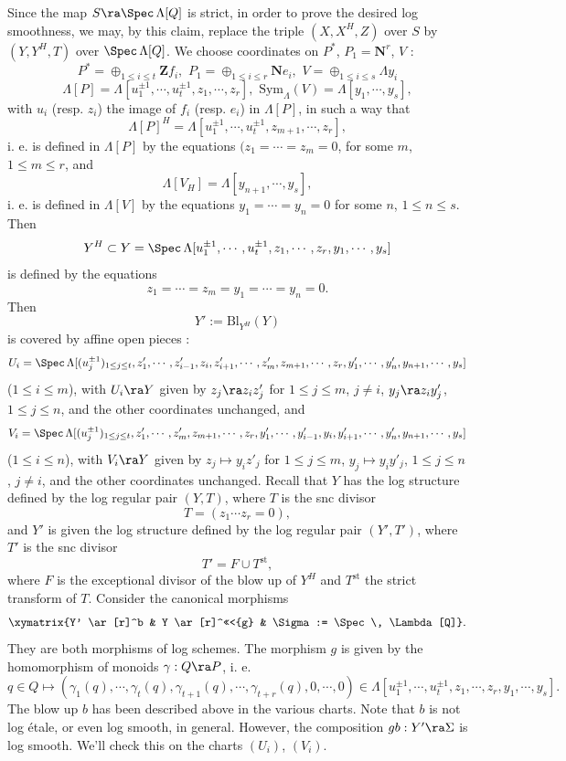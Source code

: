 \documentclass[10pt]{../fichiers-configuration-latex/smfart}
\begin{document}
Since the map $S \ra \Spec \, \Lambda[Q]$ is strict, in order to prove the
desired log smoothness, we may, by this claim, replace the triple $(X, X^H,
Z)$ over $S$ by $(Y,Y^H,T)$ over $\Spec \, \Lambda[Q]$. We choose coordinates on
$P^*$, $P_1 = \mathbf{N}^r$, $V$ : $$ P^* = \oplus_{1 \le i \le t}\mathbf{Z}f_i
, \, \, P_1 = \oplus_{1 \le i \le r}\mathbf{N}e_i, \, \, V = \oplus_{1 \le i
\le s} \Lambda y_i $$ $$ \Lambda[P] = \Lambda[u_1^{\pm 1}, \cdots, u_t^{\pm 1},
z_1, \cdots, z_r], \, \, \mathrm{Sym}_{\Lambda}(V) = \Lambda[y_1,\cdots, y_s],
$$ with $u_i$ (resp. $z_i$) the image of $f_i$ (resp. $e_i$) in $\Lambda[P]$,
in such a way that $$ \Lambda[P]^H = \Lambda[u_1^{\pm 1}, \cdots, u_t^{\pm 1},
z_{m+1}, \cdots, z_r], $$ i. e. is defined in $\Lambda[P]$ by the equations
$(z_1 = \cdots = z_m = 0$, for some $m$,  $1 \le m \le r$, and $$ \Lambda[V_H]
= \Lambda[y_{n+1}, \cdots, y_s], $$ i. e. is defined in $\Lambda[V]$ by the
equations $y_1 = \cdots = y_n = 0$ for some $n$, $1 \le n \le s$. Then $$
Y^H \subset Y = \Spec \, \Lambda[u_1^{\pm 1}, \cdots, u_t^{\pm 1},z_1, \cdots,
z_r, y_1, \cdots, y_s] $$ is defined by the equations $$ z_1 = \cdots =
z_m = y_1 = \cdots = y_n = 0.  $$ Then$$ Y' := \mathrm{Bl}_{Y^H}(Y) $$ is
covered by affine open pieces : $$ U_i = \Spec \, \Lambda[(u_j^{\pm 1})_{1
\le j  \le t}, z'_1,\cdots, z'_{i-1}, z_i, z'_{i+1}, \cdots, z'_m, z_{m+1},
\cdots, z_r, y'_1, \cdots, y'_n, y_{n+1}, \cdots, y_s] $$ ($1 \le i \le m$),
with $U_i \ra Y$ given by $z_j \ra z_iz'_j$ for $1 \le j \le m$, $j \ne i$,
$y_j \ra z_iy'_j$, $1 \le j \le n$, and the other coordinates unchanged,
and $$ V_i = \Spec \, \Lambda[(u_j^{\pm 1})_{1 \le j  \le t}, z'_1, \cdots,
z'_m,  z_{m+1}, \cdots, z_r, y'_1, \cdots, y'_{i-1},y_i,y'_{i+1}, \cdots,
y'_n, y_{n+1}, \cdots, y_s] $$ ($1 \le i \le n$), with $V_i \ra Y$ given by
$z_j \mapsto y_iz'_j$ for $1 \le j \le m$, $y_j \mapsto y_iy'_j$, $1 \le j \le
n$, $j \ne i$, and the other coordinates unchanged.  Recall that $Y$ has the
log structure defined by the log regular pair $(Y,T)$, where $T$ is the snc
divisor $$ T = (z_1 \cdots z_r = 0), $$ and $Y'$ is given the log structure
defined by the log regular pair $(Y',T')$, where $T'$ is the snc divisor $$
T' = F \cup T^{\mathrm{st}}, $$ where $F$ is the exceptional divisor of the
blow up of $Y^H$ and $T^{\mathrm{st}}$ the strict transform of $T$. Consider
the canonical morphisms $$ \xymatrix{Y' \ar[r]^b & Y \ar[r]^<<<{g} & \Sigma :=
\Spec \, \Lambda[Q]}.  $$ They are both morphisms of log schemes. The morphism
$g$ is given by the homomorphism of monoids $\gamma : Q \ra P$, i. e.  $$
q \in Q \mapsto (\gamma_1(q), \cdots, \gamma_t(q), \gamma_{t+1}(q), \cdots,
\gamma_{t+r}(q), 0, \cdots, 0) \in \Lambda[u_1^{\pm 1}, \cdots, u_t^{\pm 1},
z_1, \cdots, z_r, y_1, \cdots, y_s].  $$ The blow up $b$ has been described
above in the various charts. Note that $b$ is not log étale, or even log
smooth, in general. However, the composition $gb : Y' \ra \Sigma$ is log
smooth. We'll check this on the charts $(U_i)$, $(V_i)$.
\end{document}
